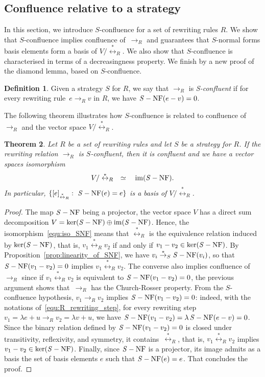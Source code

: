 \documentclass[11pt]{article}
\newtheorem{theorem}{Theorem}[section]
\theoremstyle{definition}
\newtheorem{definition}[theorem]{Definition}
\DeclareMathOperator{\im}{im}
\newcommand\rewR{\to_R}
\newcommand\transS{\overset{*}{\to}_S}
\newcommand\equivR{\overset{*}{\leftrightarrow}_R}
\DeclareMathOperator{\SNF}{{\it S}-NF}
\begin{document}
\subsection{Confluence relative to a strategy}
\label{sec:confluence_relative_to_a_strategy}

In this section, we introduce $S$-confluence for a set of rewriting rules
$R$. We show that $S$-confluence implies confluence of~$\rewR$ and
guarantees that $S$-normal forms basis elements form a basis of 
$V/\equivR$. We also show that $S$-confluence is characterised in terms
of a decreasingness property. We finish by a new proof of the diamond
lemma, based on $S$-confluence. 
\smallskip

\begin{definition}\label{def:standardisation_property}
  Given a strategy $S$ for $R$, we say that $\rewR$ is \emph{S-confluent}
  if for every rewriting rule~$e\rewR v$ in $R$, we have $\SNF(e-v)=0$.
\end{definition}
\smallskip

The following theorem illustrates how $S$-confluence is related to
confluence of $\rewR$ and the vector space $V/\equivR$.
\medskip

\begin{theorem}\label{thm:S-confluence_criterion}
  Let $R$ be a set of rewriting rules and let $S$ be a strategy for $R$.
  If the rewriting relation $\rewR$ is $S$-confluent, then it is
  confluent and we have a vector spaces isomorphism
  \begin{equation}\label{equ:iso_SNF}
    V/\equivR\quad\simeq\quad\im(\SNF).
  \end{equation}
  In particular, $\{[e]_{\equivR}:\ \SNF(e)=e\}$ is a basis of
  $V/\equivR$.
\end{theorem}

\begin{proof}
  The map $\SNF$ being a projector, the vector space $V$ has a direct sum
  decomposition $V=\ker(\SNF)\oplus\im(\SNF)$. Hence, the
  isomorphism~\eqref{equ:iso_SNF} means that $\equivR$ is the equivalence
  relation induced by $\ker(\SNF)$, that is, $v_1\equivR v_2$ if and only
  if $v_1-v_2\in\ker(\SNF)$. By Proposition~\ref{prop:linearity_of_SNF},
  we have $v_i\transS\SNF(v_i)$, so that~$\SNF(v_1-v_2)=0$ implies
  $v_1\equivR v_2$. The converse also implies confluence of $\rewR$ since
  if $v_1\equivR v_2$ is equivalent to $\SNF(v_1-v_2)=0$, the previous
  argument shows that~$\rewR$ has the Church-Rosser property. From the
  $S$-confluence hypothesis, $v_1\rewR v_2$ implies $\SNF(v_1-v_2)=0$:
  indeed, with the notations of~\eqref{equ:R_rewriting_step}, for every
  rewriting step $v_1=\lambda e+u\rewR v_2=\lambda v+u$, we have
  $\SNF(v_1-v_2)=\lambda\SNF(e-v)=0$. Since the binary relation defined
  by $\SNF(v_1-v_2)=0$ is closed under transitivity, reflexivity, and
  symmetry, it contains~$\equivR$, that is, $v_1\equivR v_2$ implies
  $v_1-v_2\in\ker(\SNF)$. Finally, since $\SNF$ is a projector, its image
  admits as a basis the set of basis elements $e$ such that $\SNF(e)=e$.
  That concludes the proof.
\end{proof}
\smallskip
\end{document}
